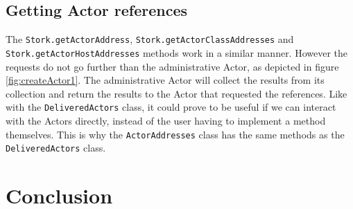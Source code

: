 \documentclass[a4paper]{article}
\begin{document}
\subsection{Getting Actor references}
The \lstinline|Stork.getActorAddress|, \lstinline|Stork.getActorClassAddresses| and \lstinline|Stork.getActorHostAddresses| methods work in a similar manner. However the requests do not go further than the administrative Actor, as depicted in figure \ref{fig:createActor1}. The administrative Actor will collect the results from its collection and return the results to the Actor that requested the references. Like with the \lstinline{DeliveredActors} class, it could prove to be useful if we can interact with the Actors directly, instead of the user having to implement a method themselves. This is why the \lstinline{ActorAddresses} class has the same methods as the \lstinline{DeliveredActors} class.
\section{Conclusion}

\printbibliography
\end{document}
